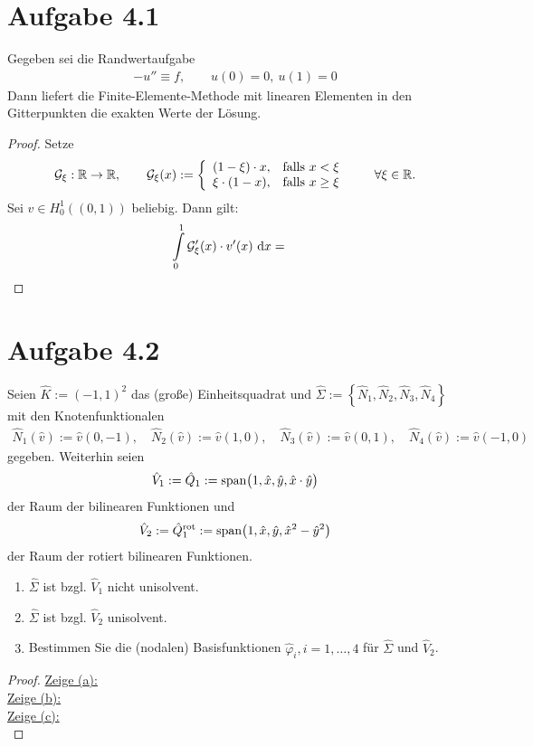 \documentclass[12pt,a4paper]{article}
\author{Willi Sontopski}
\newcommand{\G}{\mathcal{G}}
\begin{document}

\section*{Aufgabe 4.1}
Gegeben sei die Randwertaufgabe
\begin{align*}
-u''\equiv f,\qquad u(0)=0,~u(1)=0
\end{align*}
Dann liefert die Finite-Elemente-Methode mit linearen Elementen in den Gitterpunkten die exakten Werte der Lösung.

\begin{proof}
Setze
\begin{align*}
\G_\xi:\R\to\R,\qquad
\G_\xi(x):=\left\lbrace\begin{array}{cl}
(1-\xi)\cdot x, &\falls x<\xi\\
\xi\cdot(1-x), &\falls x\geq\xi
\end{array}\right.\qquad\forall\xi\in\R.
\end{align*}
Sei $v\in H_0^1((0,1))$ beliebig. Dann gilt:
\begin{align*}
\int\limits_0^1\G_\xi'(x)\cdot v'(x)\d x
&=
\end{align*}
\end{proof}

\section*{Aufgabe 4.2}
Seien $\hat{K}:=(-1,1)^2$ das (große) Einheitsquadrat und $\hat{\Sigma}:=\left\lbrace\hat{N}_1,\hat{N}_2,\hat{N}_3,\hat{N}_4\right\rbrace$ mit den Knotenfunktionalen 
\begin{align*}
\hat{N}_1(\hat{v}):=\hat{v}(0,-1),\quad
\hat{N}_2(\hat{v}):=\hat{v}(1,0),\quad
\hat{N}_3(\hat{v}):=\hat{v}(0,1),\quad
\hat{N}_4(\hat{v}):=\hat{v}(-1,0)
\end{align*}
gegeben. Weiterhin seien 
\begin{align*}
\hat{V}_1:=\hat{Q}_1:=\text{span}\big(1,\hat{x},\hat{y},\hat{x}\cdot\hat{y}\big)
\end{align*}
der Raum der bilinearen Funktionen und
\begin{align*}
\hat{V}_2:=\hat{Q}_1^{\text{rot}}:=\text{span}\big(1,\hat{x},\hat{y},\hat{x}^2-\hat{y}^2\big)
\end{align*}
der Raum der rotiert bilinearen Funktionen.
\begin{enumerate}[label=(\alph*)]
\item $\hat{\Sigma}$ ist bzgl. $\hat{V}_1$ nicht unisolvent.
\item $\hat{\Sigma}$ ist bzgl. $\hat{V}_2$ unisolvent.
\item Bestimmen Sie die (nodalen) Basisfunktionen $\hat{\varphi}_i,i=1,\ldots,4$ für $\hat{\Sigma}$ und $\hat{V}_2$.
\end{enumerate}
\begin{proof}
\underline{Zeige (a):}\\

\underline{Zeige (b):}\\

\underline{Zeige (c):}\\

\end{proof}
\end{document}
